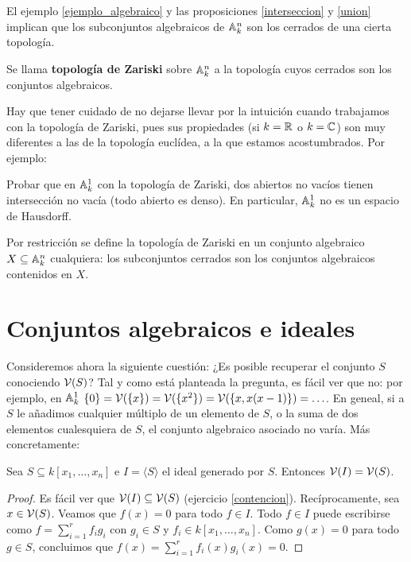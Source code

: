 \documentclass[ACGA.tex]{subfiles}
\begin{document}
El ejemplo \ref{ejemplo_algebraico} y las proposiciones \ref{interseccion} y \ref{union} implican que los subconjuntos algebraicos de $\mathbb{A}^n_k$ son los cerrados de una cierta topología.

\begin{defi}
 Se llama {\bf topología de Zariski} sobre $\mathbb{A}^n_k$ a la topología cuyos cerrados son los conjuntos algebraicos.
\end{defi}

Hay que tener cuidado de no dejarse llevar por la intuición cuando trabajamos con la topología de Zariski, pues sus propiedades (si $k=\mathbb{R}$ o $k=\mathbb{C}$) son muy diferentes a las de la topología euclídea, a la que estamos acostumbrados. Por ejemplo:

\begin{ejer} Probar que en $\mathbb{A}^1_k$ con la topología de Zariski, dos abiertos no vacíos tienen intersección no vacía (todo abierto es denso). En particular, $\mathbb{A}^1_k$ no es un espacio de Hausdorff.
 
\end{ejer}

Por restricción se define la topología de Zariski en un conjunto algebraico $X\subseteq\mathbb{A}^n_k$ cualquiera: los subconjuntos cerrados son los conjuntos algebraicos contenidos en $X$.

\section{Conjuntos algebraicos e ideales}

Consideremos ahora la siguiente cuestión: ¿Es posible recuperar el conjunto $S$ conociendo $\mathcal{V}(S)$? Tal y como está planteada la pregunta, es fácil ver que no: por ejemplo, en $\mathbb{A}^1_k$ $\{0\}=\mathcal{V}(\{x\})=\mathcal{V}(\{x^2\})=\mathcal{V}(\{x,x(x-1)\})=\ldots$. En geneal, si a $S$ le añadimos cualquier múltiplo de un elemento de $S$, o la suma de dos elementos cualesquiera de $S$, el conjunto algebraico asociado no varía. Más concretamente:

\begin{prop} Sea $S\subseteq k[x_1,\ldots,x_n]$ e $I=\langle S\rangle$ el ideal generado por $S$. Entonces $\mathcal{V}(I)=\mathcal{V}(S)$.
 
\end{prop}

\begin{proof}
 Es fácil ver que $\mathcal{V}(I)\subseteq \mathcal{V}(S)$ (ejercicio \ref{contencion}). Recíprocamente, sea $x\in \mathcal{V}(S)$. Veamos que $f(x)=0$ para todo $f\in I$. Todo $f\in I$ puede escribirse como $f=\sum_{i=1}^r f_i g_i$ con $g_i\in S$ y $f_i\in k[x_1,\ldots,x_n]$. Como $g(x)=0$ para todo $g\in S$, concluimos que $f(x)=\sum_{i=1}^r f_i(x)g_i(x)=0$.
\end{proof}
\end{document}
